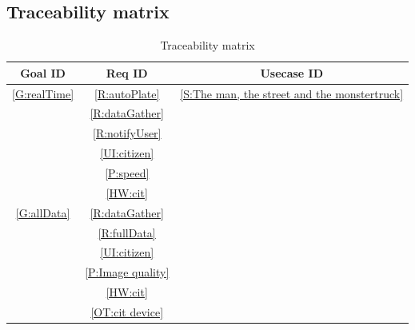 \documentclass{article}
\begin{document}
	\subsection{Traceability matrix}
		\begin{table}[H]
			\begin{center}
			\caption{Traceability matrix}
			\small
			\label{Trace matrix}
			\begin{tabular}{|c|c|c|}
			\hline
				\textbf{Goal ID} & \textbf{Req ID} & \textbf{Usecase ID}\\
			\hline
				\ref{G:realTime} 			&\ref{R:autoPlate}						&\ref{S:The man,
																					the street and the
																					monstertruck}\\
											&\ref{R:dataGather}						&\\
											&\ref{R:notifyUser}						&\\
											&\ref{UI:citizen} 						&\\
											&\ref{P:speed}							&\\
											&\ref{HW:cit}							&\\
			\hline
				\ref{G:allData} 				&\ref{R:dataGather} 						&\\
											&\ref{R:fullData} 						&\\
											&\ref{UI:citizen}						&\\
											&\ref{P:Image quality}					&\\
											&\ref{HW:cit}							&\\
											&\ref{OT:cit device}						&\\	
											

\end{tabular}
\end{center}
\end{table}
\end{document}
